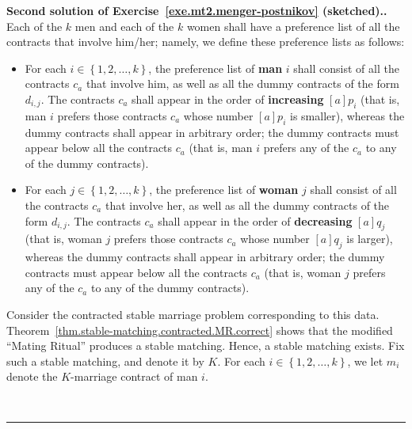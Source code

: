 \documentclass[numbers=enddot,12pt,final,onecolumn,notitlepage]{scrartcl}%
\theoremstyle{definition}
\newenvironment{proof}[1][Proof]{\noindent\textbf{#1.} }{\ \rule{0.5em}{0.5em}}
\newcommand{\set}[1]{\left\{ #1 \right\}}
\newcommand{\ive}[1]{\left[ #1 \right]}
\begin{document}
\begin{proof}[Second solution of
Exercise~\ref{exe.mt2.menger-postnikov} (sketched).]
Each of the $k$ men and each of the $k$ women shall have
a preference list of all the contracts that involve him/her;
namely, we define these preference lists as follows:
\begin{itemize}
 \item For each $i \in \set{1, 2, \ldots, k}$, the
       preference list of \textbf{man} $i$ shall consist of all
       the contracts $c_a$ that involve him,
       as well as all the dummy contracts of
       the form $d_{i, j}$.
       The contracts $c_a$ shall appear in the order of
       \textbf{increasing} $\ive{a} p_i$ (that is, man $i$ prefers
       those contracts $c_a$ whose number $\ive{a} p_i$ is
       smaller),
       whereas the dummy contracts shall appear in
       arbitrary order;
       the dummy contracts must appear below all the
       contracts $c_a$ (that is, man $i$ prefers any of
       the $c_a$ to any of the dummy contracts).
 \item For each $j \in \set{1, 2, \ldots, k}$, the
       preference list of \textbf{woman} $j$ shall consist of all
       the contracts $c_a$ that involve her,
       as well as all the dummy contracts of
       the form $d_{i, j}$.
       The contracts $c_a$ shall appear in the order of
       \textbf{decreasing} $\ive{a} q_j$ (that is, woman $j$ prefers
       those contracts $c_a$ whose number $\ive{a} q_j$ is
       larger),
       whereas the dummy contracts shall appear in
       arbitrary order;
       the dummy contracts must appear below all the
       contracts $c_a$ (that is, woman $j$ prefers any of
       the $c_a$ to any of the dummy contracts).
\end{itemize}

Consider the contracted stable marriage problem corresponding to
this data.
Theorem~\ref{thm.stable-matching.contracted.MR.correct} shows that
the modified ``Mating Ritual'' produces a stable matching.
Hence, a stable matching exists.
Fix such a stable matching, and denote it by $K$.
For each $i \in \set{1, 2, \ldots, k}$, we let $m_i$ denote
the $K$-marriage contract of man $i$.


\end{proof}
\end{document}
